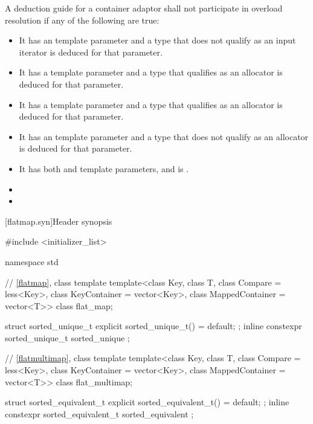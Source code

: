 \pnum
A deduction guide for a container adaptor shall not participate in overload resolution if any of the following are true:
\begin{itemize}
\item It has an  template parameter and a type that does not qualify as an input iterator is deduced for that parameter.
\item It has a  template parameter and a type that qualifies as an allocator is deduced for that parameter.
\item It has a  template parameter and a type that qualifies as an allocator is deduced for that parameter.
\item It has an  template parameter and a type that does not qualify as an allocator is deduced for that parameter.
\item It has both  and  template parameters, and  is .
\item {}
\item {}
\end{itemize}

\noindent\makebox[\linewidth]{\rule{\textwidth}{0.4pt}}

\setcounter{subsection}{3}
\begin{addedblock}
[flatmap.syn]{Header  synopsis}%
%

\begin{codeblock}
#include <initializer_list>

namespace std {
  // \ref{flatmap}, class template 
  template<class Key, class T, class Compare = less<Key>,
           class KeyContainer = vector<Key>, class MappedContainer = vector<T>>
    class flat_map;

  struct sorted_unique_t { explicit sorted_unique_t() = default; };
  inline constexpr sorted_unique_t sorted_unique {};

  // \ref{flatmultimap}, class template 
  template<class Key, class T, class Compare = less<Key>,
           class KeyContainer = vector<Key>, class MappedContainer = vector<T>>
    class flat_multimap;

  struct sorted_equivalent_t { explicit sorted_equivalent_t() = default; };
  inline constexpr sorted_equivalent_t sorted_equivalent {};
}
\end{codeblock}
\end{addedblock}

